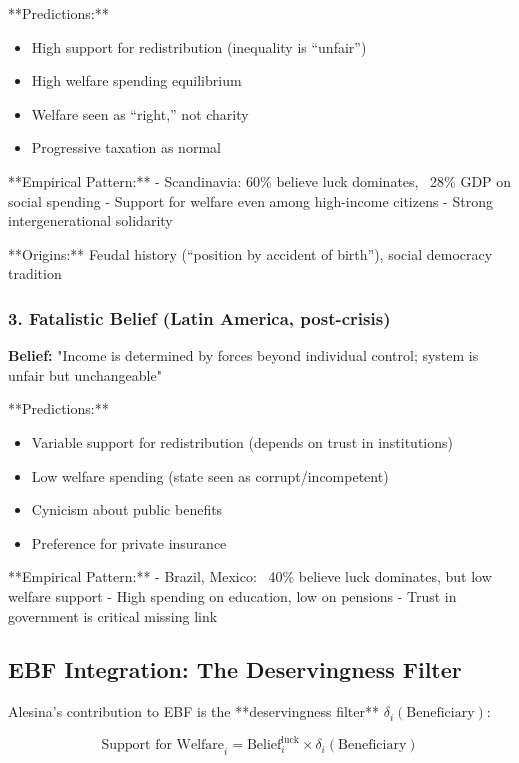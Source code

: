 **Predictions:**
\begin{itemize}
\item High support for redistribution (inequality is ``unfair'')
\item High welfare spending equilibrium
\item Welfare seen as ``right,'' not charity
\item Progressive taxation as normal
\end{itemize}

**Empirical Pattern:**
- Scandinavia: 60\% believe luck dominates, ~28\% GDP on social spending
- Support for welfare even among high-income citizens
- Strong intergenerational solidarity

**Origins:** Feudal history (``position by accident of birth''), social democracy tradition

\subsubsection{3. Fatalistic Belief (Latin America, post-crisis)}

\textbf{Belief:} "Income is determined by forces beyond individual control; system is unfair but unchangeable"

**Predictions:**
\begin{itemize}
\item Variable support for redistribution (depends on trust in institutions)
\item Low welfare spending (state seen as corrupt/incompetent)
\item Cynicism about public benefits
\item Preference for private insurance
\end{itemize}

**Empirical Pattern:**
- Brazil, Mexico: ~40\% believe luck dominates, but low welfare support
- High spending on education, low on pensions
- Trust in government is critical missing link

\subsection{EBF Integration: The Deservingness Filter}

Alesina's contribution to EBF is the **deservingness filter** $\delta_i(\text{Beneficiary})$:

\begin{equation}
\text{Support for Welfare}_i = \text{Belief}_i^{\text{luck}} \times \delta_i(\text{Beneficiary})
\end{equation}

